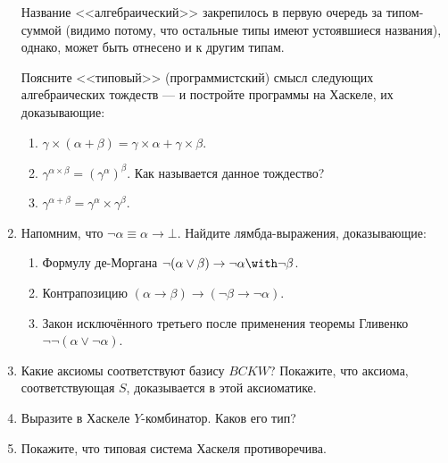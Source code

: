 \documentclass[10pt,a4paper,oneside]{article}
\begin{document}
\begin{enumerate}
Название <<алгебраический>> закрепилось в первую очередь за типом-суммой (видимо потому,
что остальные типы имеют устоявшиеся названия), однако, может быть отнесено и к другим
типам.

Поясните <<типовый>> (программистский) смысл следующих алгебраических тождеств --- и постройте
программы на Хаскеле, их доказывающие:
\begin{enumerate}
\item $\gamma\times(\alpha+\beta) = \gamma\times\alpha + \gamma\times\beta$.
\item $\gamma^{\alpha\times\beta} = {(\gamma^\alpha)}^\beta$. Как называется данное тождество?
\item $\gamma^{\alpha+\beta} = \gamma^\alpha\times\gamma^\beta$.
\end{enumerate}

\item Напомним, что $\neg\alpha \equiv \alpha\rightarrow\bot$. Найдите лямбда-выражения, доказывающие:
\begin{enumerate}
\item Формулу де-Моргана $\neg(\alpha\vee\beta)\to\neg\alpha\with\neg\beta$.
\item Контрапозицию $(\alpha\to\beta)\to(\neg\beta\to\neg\alpha)$.
\item Закон исключённого третьего после применения теоремы Гливенко $\neg\neg(\alpha\vee\neg\alpha)$.
\end{enumerate}

\item Какие аксиомы соответствуют базису $BCKW$? Покажите, что аксиома, соответствующая $S$,
доказывается в этой аксиоматике.

\item Выразите в Хаскеле $Y$-комбинатор. Каков его тип?

\item Покажите, что типовая система Хаскеля противоречива.

\end{enumerate}
\end{document}

